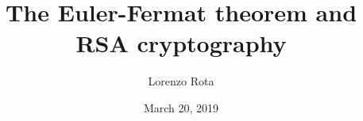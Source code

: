 \documentclass[12pt, a4paper, openany]{article}
\title{The Euler-Fermat theorem and RSA cryptography}
\author{Lorenzo Rota}
\date{March 20, 2019}
\begin{document}





\nocite{*}
\pagebreak
\printbibliography
\end{document}
